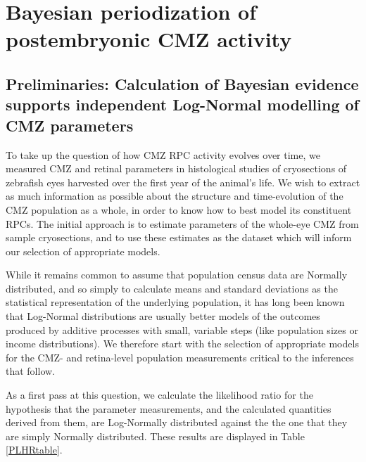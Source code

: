 \chapter{Bayesian periodization of postembryonic CMZ activity}
\label{chap:CMZ}

\section{Preliminaries: Calculation of Bayesian evidence supports independent Log-Normal modelling of CMZ parameters}
To take up the question of how CMZ RPC activity evolves over time, we measured CMZ and retinal parameters in histological studies of cryosections of zebrafish eyes harvested over the first year of the animal's life. We wish to extract as much information as possible about the structure and time-evolution of the CMZ population as a whole, in order to know how to best model its constituent RPCs. The initial approach is to estimate parameters of the whole-eye CMZ from sample cryosections, and to use these estimates as the dataset which will inform our selection of appropriate models.

While it remains common to assume that population census data are Normally distributed, and so simply to calculate means and standard deviations as the statistical representation of the underlying population, it has long been known \cite{Heath1967} that Log-Normal distributions are usually better models of the outcomes produced by additive processes with small, variable steps (like population sizes or income distributions). We therefore start with the selection of appropriate models for the CMZ- and retina-level population measurements critical to the inferences that follow.

As a first pass at this question, we calculate the likelihood ratio for the hypothesis that the parameter measurements, and the calculated quantities derived from them, are Log-Normally distributed against the the one that they are simply Normally distributed. These results are displayed in Table \ref{PLHRtable}.

